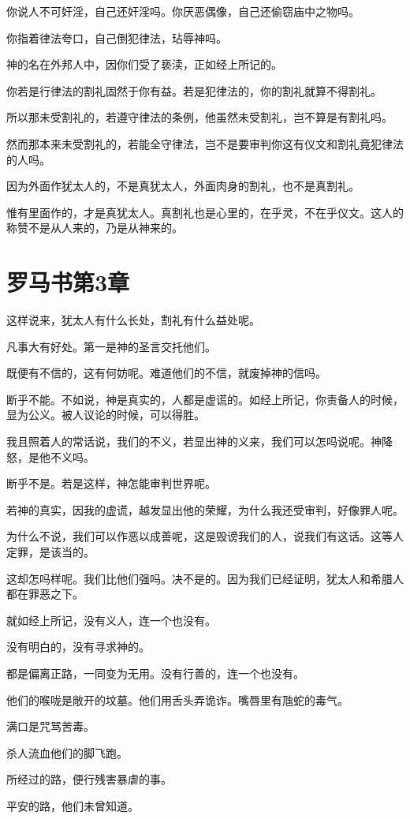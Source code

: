 \documentclass[12pt,oneside]{book}
\begin{document}
你说人不可奸淫，自己还奸淫吗。你厌恶偶像，自己还偷窃庙中之物吗。

你指着律法夸口，自己倒犯律法，玷辱神吗。

神的名在外邦人中，因你们受了亵渎，正如经上所记的。

你若是行律法的割礼固然于你有益。若是犯律法的，你的割礼就算不得割礼。

所以那未受割礼的，若遵守律法的条例，他虽然未受割礼，岂不算是有割礼吗。

然而那本来未受割礼的，若能全守律法，岂不是要审判你这有仪文和割礼竟犯律法的人吗。

因为外面作犹太人的，不是真犹太人，外面肉身的割礼，也不是真割礼。

惟有里面作的，才是真犹太人。真割礼也是心里的，在乎灵，不在乎仪文。这人的称赞不是从人来的，乃是从神来的。

\chapter{罗马书第3章}
这样说来，犹太人有什么长处，割礼有什么益处呢。

凡事大有好处。第一是神的圣言交托他们。

既便有不信的，这有何妨呢。难道他们的不信，就废掉神的信吗。

断乎不能。不如说，神是真实的，人都是虚谎的。如经上所记，你责备人的时候，显为公义。被人议论的时候，可以得胜。

我且照着人的常话说，我们的不义，若显出神的义来，我们可以怎吗说呢。神降怒，是他不义吗。

断乎不是。若是这样，神怎能审判世界呢。

若神的真实，因我的虚谎，越发显出他的荣耀，为什么我还受审判，好像罪人呢。

为什么不说，我们可以作恶以成善呢，这是毁谤我们的人，说我们有这话。这等人定罪，是该当的。

这却怎吗样呢。我们比他们强吗。决不是的。因为我们已经证明，犹太人和希腊人都在罪恶之下。

就如经上所记，没有义人，连一个也没有。

没有明白的，没有寻求神的。

都是偏离正路，一同变为无用。没有行善的，连一个也没有。

他们的喉咙是敞开的坟墓。他们用舌头弄诡诈。嘴唇里有虺蛇的毒气。

满口是咒骂苦毒。

杀人流血他们的脚飞跑。

所经过的路，便行残害暴虐的事。

平安的路，他们未曾知道。
\end{document}
